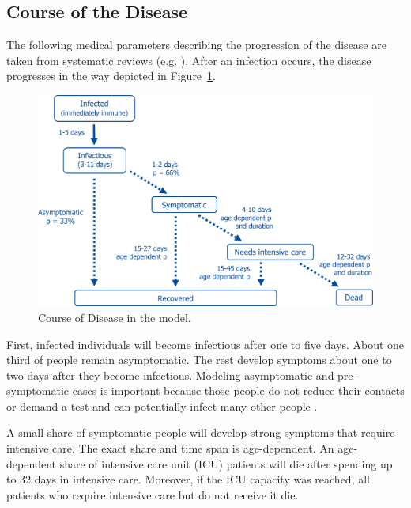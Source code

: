 \subsection{Course of the Disease}
\label{sub:course_of_disease}

The following medical parameters describing the progression of the disease are taken
from systematic reviews (e.g. \citet{He2020}). After an infection occurs, the disease
progresses in the way depicted in Figure~\ref{fig:course_of_disease}.

\begin{figure}[!tp]
    \includegraphics[width=\textwidth]{../figures/disease_progression.png}
    \caption{Course of Disease in the model.}
    \label{fig:course_of_disease}
\end{figure}

First, infected individuals will become infectious after one to five days. About one
third of people remain asymptomatic. The rest develop symptoms about one to two days
after they become infectious. Modeling asymptomatic and pre-symptomatic cases is
important because those people do not reduce their contacts or demand a test and can
potentially infect many other people \citep{Donsimoni2020}.

A small share of symptomatic people will develop strong symptoms that require intensive
care. The exact share and time span is age-dependent. An age-dependent share of
intensive care unit (ICU) patients will die after spending up to 32 days in intensive
care. Moreover, if the ICU capacity was reached, all patients who require intensive care
but do not receive it die.

